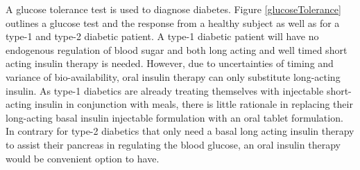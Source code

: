 A glucose tolerance test is used to diagnose diabetes. Figure \ref{glucoseTolerance} outlines a glucose \DIFdelbegin {}\DIFdelend \DIFaddbegin {}\DIFaddend test and the response from a healthy subject as well as for a type-1 and type-2 diabetic patient. A type-1 diabetic patient will have no endogenous regulation of blood sugar and both long acting and well timed short acting insulin therapy is needed. However, due to uncertainties of timing and variance of bio-availability, oral insulin therapy can only substitute long-acting insulin. As type-1 diabetics are already treating themselves with injectable short-acting insulin in conjunction with meals, there is little rationale in replacing their long-acting basal insulin injectable formulation with an oral tablet formulation. In contrary for type-2 diabetics that only need a basal long acting insulin therapy to assist their pancreas in regulating the blood glucose, an oral insulin therapy would be \DIFaddbegin {}\DIFaddend convenient option to have.





